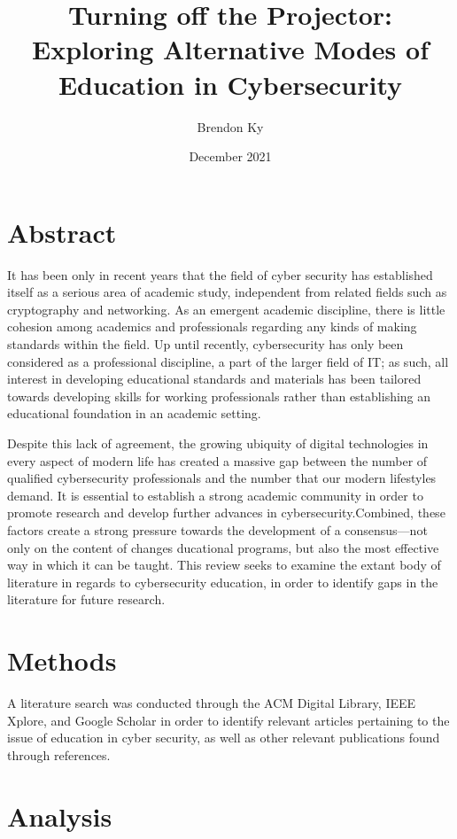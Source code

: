 \documentclass{article}
\title{
    Turning off the Projector: \\
    \large Exploring Alternative Modes of Education in Cybersecurity
}
\author{Brendon Ky}
\date{December 2021}
\begin{document}
\maketitle

\section{Abstract}

    It has been only in recent years that the field of cyber security has established itself as a serious area of academic study, independent from related fields such as cryptography and networking. As an emergent academic discipline, there is little cohesion among academics and professionals regarding any kinds of making standards within the field. Up until recently, cybersecurity has only been considered as a professional discipline, a part of the larger field of IT; as such, all interest in developing educational standards and materials has been tailored towards developing skills for working professionals rather than establishing an educational foundation in an academic setting. 

    Despite this lack of agreement, the growing ubiquity of digital technologies in every aspect of modern life has created a massive gap between the number of qualified cybersecurity professionals and the number that our modern lifestyles demand. It is essential to establish a strong academic community in order to promote research and develop further advances in cybersecurity.Combined, these factors create a strong pressure towards the development of a consensus---not only on the content of changes ducational programs, but also the most effective way in which it can be taught. This review seeks to examine the extant body of literature in regards to cybersecurity education, in order to identify gaps in the literature for future research.

\section{Methods}

    A literature search was conducted through the ACM Digital Library, IEEE Xplore, and Google Scholar in order to identify relevant articles pertaining to the issue of education in cyber security, as well as other relevant publications found through references.

\section{Analysis}
\end{document}
